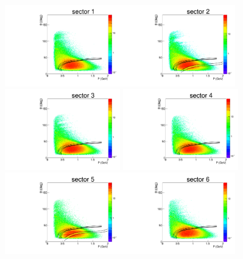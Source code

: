 \begin{figure}[htp]
\begin{center}
\begin{minipage}{.99\textwidth}
\begin{framed}
\includegraphics[width=5cm]{pictures/other_cuts/fiduch/th_vs_p_p/p_th_vs_p_sector1.pdf}\includegraphics[width=5cm]{pictures/other_cuts/fiduch/th_vs_p_p/p_th_vs_p_sector2.pdf}\includegraphics[width=5cm]{pictures/other_cuts/fiduch/th_vs_p_p/p_th_vs_p_sector3.pdf}
\includegraphics[width=5cm]{pictures/other_cuts/fiduch/th_vs_p_p/p_th_vs_p_sector4.pdf}\includegraphics[width=5cm]{pictures/other_cuts/fiduch/th_vs_p_p/p_th_vs_p_sector5.pdf}\includegraphics[width=5cm]{pictures/other_cuts/fiduch/th_vs_p_p/p_th_vs_p_sector6.pdf}

\end{framed}
\end{minipage}
\end{center}
\end{figure}
